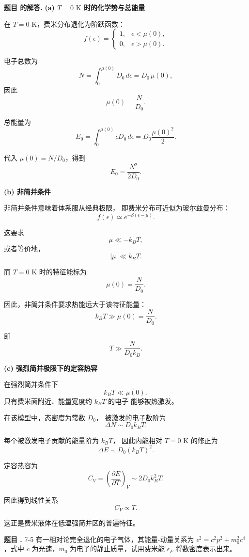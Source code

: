 \documentclass[12pt, a4paper, oneside]{ctexart}
\newcounter{problemname}
\newenvironment{problem}
  {\begin{shaded}\stepcounter{problemname}\par\noindent\textbf{题目 \theproblemname. }}
  {\end{shaded}\par}
\newenvironment{solution}
  {\par\noindent\textbf{题目 \theproblemname 的解答. }}
  {\par}
\begin{document}
\begin{solution}
  \textbf{(a) $T=0\text{ K}$ 时的化学势与总能量}

在 $T=0$ K，费米分布退化为阶跃函数：
\[
f(\epsilon)=
\begin{cases}
1, & \epsilon<\mu(0),\\
0, & \epsilon>\mu(0).
\end{cases}
\]

电子总数为
\[
N=\int_0^{\mu(0)} D_0\,d\epsilon
= D_0\,\mu(0),
\]
因此
\[
\boxed{\mu(0)=\frac{N}{D_0}}.
\]

总能量为
\[
E_0=\int_0^{\mu(0)} \epsilon D_0\,d\epsilon
= D_0\frac{\mu(0)^2}{2}.
\]

代入 $\mu(0)=N/D_0$，得到
\[
\boxed{
E_0=\frac{N^2}{2D_0}
}.
\]

\textbf{(b) 非简并条件}

非简并条件意味着体系服从经典极限，
即费米分布可近似为玻尔兹曼分布：
\[
f(\epsilon)\simeq e^{-\beta(\epsilon-\mu)}.
\]

这要求
\[
\mu \ll -k_BT,
\]
或者等价地，
\[
|\mu|\ll k_BT.
\]

而 $T=0$ K 时的特征能标为
\[
\mu(0)=\frac{N}{D_0}.
\]

因此，非简并条件要求热能远大于该特征能量：
\[
k_BT \gg \mu(0)=\frac{N}{D_0}.
\]

即
\[
\boxed{
T \gg \frac{N}{D_0 k_B}
}.
\]

\textbf{(c) 强烈简并极限下的定容热容}

在强烈简并条件下
\[
k_BT \ll \mu(0),
\]
只有费米面附近、能量宽度约 $k_BT$ 的电子
能够被热激发。

在该模型中，态密度为常数 $D_0$，
被激发的电子数阶为
\[
\Delta N \sim D_0 k_BT.
\]

每个被激发电子贡献的能量阶为 $k_BT$，
因此内能相对 $T=0$ K 的修正为
\[
\Delta E \sim D_0 (k_BT)^2.
\]

定容热容为
\[
C_V=\left(\frac{\partial E}{\partial T}\right)_V
\sim 2D_0 k_B^2 T.
\]

因此得到线性关系
\[
\boxed{
C_V \propto T
}.
\]

这正是费米液体在低温强简并区的普遍特征。
\end{solution}

\begin{problem}{7-5}
  有一相对论完全退化的电子气体，其能量-动量关系为 $\epsilon^2 = c^2p^2 + m_0^2c^4$，式中 $c$ 为光速，$m_0$ 为电子的静止质量，试用费米能 $\epsilon_F$ 将数密度表示出来。
\end{problem}
\end{document}

